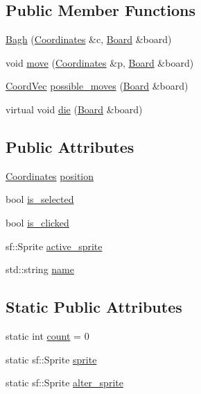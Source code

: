 \subsection*{Public Member Functions}
\begin{DoxyCompactItemize}
\item 
\mbox{\hyperlink{class_bagh_a0fb9fd6062c5eaf058b0ea6bf0d53336}{Bagh}} (\mbox{\hyperlink{class_coordinates}{Coordinates}} \&c, \mbox{\hyperlink{class_board}{Board}} \&board)
\item 
void \mbox{\hyperlink{class_bagh_a31917bfad63a224e336bcdfaed2e5361}{move}} (\mbox{\hyperlink{class_coordinates}{Coordinates}} \&p, \mbox{\hyperlink{class_board}{Board}} \&board)
\item 
\mbox{\hyperlink{main_8cpp_a267937870648899c879128d3199195ec}{Coord\+Vec}} \mbox{\hyperlink{class_bagh_ad98b7e209113ed6e5932ad732283b66a}{possible\+\_\+moves}} (\mbox{\hyperlink{class_board}{Board}} \&board)
\item 
virtual void \mbox{\hyperlink{class_piece_a2f3261b1482b5635b6aa0bf67c588b98}{die}} (\mbox{\hyperlink{class_board}{Board}} \&board)
\end{DoxyCompactItemize}
\subsection*{Public Attributes}
\begin{DoxyCompactItemize}
\item 
\mbox{\hyperlink{class_coordinates}{Coordinates}} \mbox{\hyperlink{class_piece_a3a789618e64cb8139a2bc79f44bb6edb}{position}}
\item 
bool \mbox{\hyperlink{class_piece_a21b7b54849acd46163b4b6281b5b0e57}{is\+\_\+selected}}
\item 
bool \mbox{\hyperlink{class_piece_ab2ba8aa3a4471ff1a5400fe0617657cb}{is\+\_\+clicked}}
\item 
sf\+::\+Sprite \mbox{\hyperlink{class_piece_a65fa621a87983d21756c2d2d63e8189b}{active\+\_\+sprite}}
\item 
std\+::string \mbox{\hyperlink{class_piece_aceb5b0dda6aa7ac881abe103bb98ac7e}{name}}
\end{DoxyCompactItemize}
\subsection*{Static Public Attributes}
\begin{DoxyCompactItemize}
\item 
static int \mbox{\hyperlink{class_bagh_a86a681a06d8a497159f08dceb735c5e9}{count}} = 0
\item 
static sf\+::\+Sprite \mbox{\hyperlink{class_bagh_ad8af00ee831b82cea1df1f801a1d77c7}{sprite}}
\item 
static sf\+::\+Sprite \mbox{\hyperlink{class_bagh_a74e32ec82d74640ab6ae7e0fbf5d05c4}{alter\+\_\+sprite}}
\end{DoxyCompactItemize}


